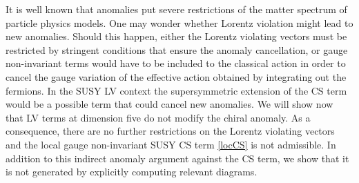 \documentclass[12pt]{revtex4}
\begin{document}
It is well known that anomalies put severe restrictions of the matter
spectrum of particle physics models. One may wonder whether Lorentz
violation might lead to new anomalies. Should this happen, either the Lorentz
violating vectors must be restricted by stringent conditions that ensure the
anomaly cancellation, or gauge non-invariant terms would have to be
included to the classical action in order to cancel the gauge
variation of the effective action obtained by integrating out the
fermions. In the SUSY LV context the supersymmetric extension of the
CS term would be a possible term that could cancel new  
anomalies. We will show now that LV terms at dimension five
do not modify the chiral anomaly. As a consequence, there are no
further restrictions on the Lorentz violating vectors and the 
local gauge non-invariant SUSY CS term \eqref{locCS} is not
admissible. In addition to this indirect anomaly argument against the
CS term, we show  that it is not
generated by explicitly computing relevant diagrams. 
\end{document}
